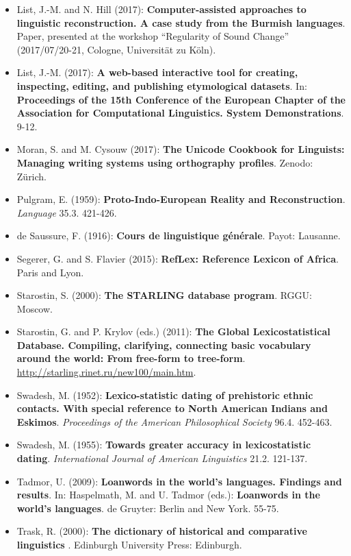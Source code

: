 \documentclass[a4paper,svgnames]{scrartcl}
\begin{document}
\begin{itemize}
{  between words and their implication for phylogenetic reconstruction}.
  \emph{Journal of Language Evolution} 1.2. 119-136.
\item
  List, J.-M. and N. Hill (2017): \textbf{Computer-assisted approaches
  to linguistic reconstruction. A case study from the Burmish
  languages}. Paper, presented at the workshop ``Regularity of Sound
  Change'' (2017/07/20-21, Cologne, Universität zu Köln).
\item
  List, J.-M. (2017): \textbf{A web-based interactive tool for creating,
  inspecting, editing, and publishing etymological datasets}. In:
  \textbf{Proceedings of the 15th Conference of the European Chapter of
  the Association for Computational Linguistics. System Demonstrations}.
  9-12.
\item
  Moran, S. and M. Cysouw (2017): \textbf{The Unicode Cookbook for
  Linguists: Managing writing systems using orthography profiles}.
  Zenodo: Zürich.
\item
  Pulgram, E. (1959): \textbf{Proto-Indo-European Reality and
  Reconstruction}. \emph{Language} 35.3. 421-426.
\item
  de Saussure, F. (1916): \textbf{Cours de linguistique générale}.
  Payot: Lausanne.
\item
  Segerer, G. and S. Flavier (2015): \textbf{RefLex: Reference Lexicon
  of Africa}. Paris and Lyon.
\item
  Starostin, S. (2000): \textbf{The STARLING database program}. RGGU:
  Moscow.
\item
  Starostin, G. and P. Krylov (eds.) (2011): \textbf{The Global
  Lexicostatistical Database. Compiling, clarifying, connecting basic
  vocabulary around the world: From free-form to tree-form}.
  \href{”http://starling.rinet.ru/new100/main.htm”}{http://starling.rinet.ru/new100/main.htm}.
\item
  Swadesh, M. (1952): \textbf{Lexico-statistic dating of prehistoric
  ethnic contacts. With special reference to North American Indians and
  Eskimos}. \emph{Proceedings of the American Philosophical Society}
  96.4. 452-463.
\item
  Swadesh, M. (1955): \textbf{Towards greater accuracy in
  lexicostatistic dating}. \emph{International Journal of American
  Linguistics} 21.2. 121-137.
\item
  Tadmor, U. (2009): \textbf{Loanwords in the world's languages.
  Findings and results}. In: Haspelmath, M. and U. Tadmor (eds.):
  \textbf{Loanwords in the world's languages}. de Gruyter: Berlin and
  New York. 55-75.
\item
  Trask, R. (2000): \textbf{The dictionary of historical and comparative
  linguistics} . Edinburgh University Press: Edinburgh.
\end{itemize}
\end{document}
